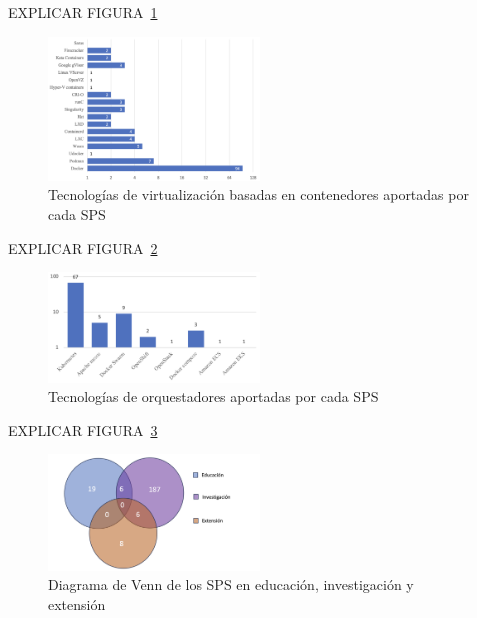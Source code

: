 EXPLICAR FIGURA~\ref{fig:SPS-VBC}
\begin{figure}[htbp]
    \centering
    \includegraphics[width=0.5\textwidth]{resources/images/resultados/SPS-VBC.png}
    \caption{Tecnologías de virtualización basadas en contenedores aportadas por cada SPS}\label{fig:SPS-VBC}
\end{figure} 


EXPLICAR FIGURA~\ref{fig:SPS-ORCH}
\begin{figure}[htbp]
    \centering
    \includegraphics[width=0.5\textwidth]{resources/images/resultados/orch-SPS.png}
    \caption{Tecnologías de orquestadores aportadas por cada SPS}\label{fig:SPS-ORCH}
\end{figure}

EXPLICAR FIGURA~\ref{fig:SPS-venn}
\begin{figure}[htbp]
    \centering
    \includegraphics[width=0.5\textwidth]{resources/images/resultados/SPS-venn.png}
    \caption{Diagrama de Venn de los SPS en educación, investigación y extensión}\label{fig:SPS-venn}
\end{figure}

